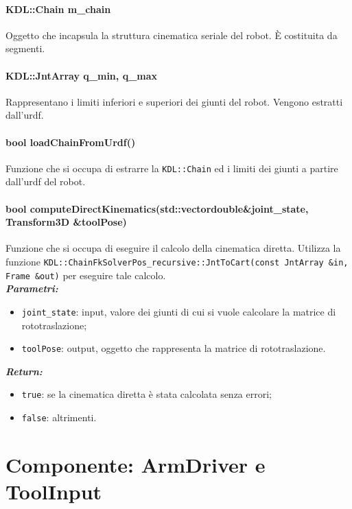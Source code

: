 \paragraph{KDL::Chain m\_chain}
Oggetto che incapsula la struttura cinematica seriale del robot. È costituita da segmenti.

\paragraph{KDL::JntArray q\_min, q\_max}
Rappresentano i limiti inferiori e superiori dei giunti del robot. Vengono estratti dall'urdf.

\paragraph{bool loadChainFromUrdf()}
Funzione che si occupa di estrarre la \texttt{KDL::Chain} ed i limiti dei giunti a partire dall'urdf del robot.

\paragraph{bool computeDirectKinematics(std::vector\tl double\tr \&joint\_state, Transform3D \&toolPose)}

Funzione che si occupa di eseguire il calcolo della cinematica diretta. Utilizza la funzione \texttt{KDL::ChainFkSolverPos\_recursive::JntToCart(const JntArray \&in, Frame \&out)} per eseguire tale calcolo.  \\
\textbf{\textit{Parametri:}}
\begin{itemize}
	\item \texttt{joint\_state}: input, valore dei giunti di cui si vuole calcolare la matrice di rototraslazione; 
	\item \texttt{toolPose}: output, oggetto che rappresenta la matrice di rototraslazione.
\end{itemize}
\textbf{\textit{Return:}}
\begin{itemize}
	\item \texttt{true}: se la cinematica diretta è stata calcolata senza errori;
	\item \texttt{false}: altrimenti.
\end{itemize}


\section{Componente: ArmDriver e ToolInput}
